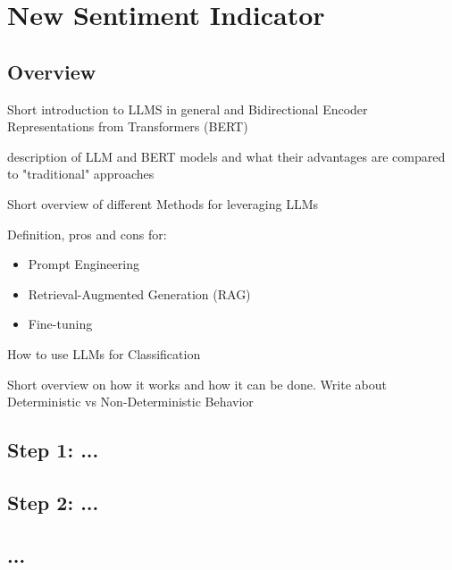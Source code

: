 \chapter{New Sentiment Indicator}\label{sec3}
\thispagestyle{empty}

\section{Overview}

Short introduction to LLMS in general and Bidirectional Encoder Representations from Transformers (BERT)

description of LLM and BERT models and what their advantages are compared to "traditional" approaches

Short overview of different Methods for leveraging LLMs

Definition, pros and cons for:

\begin{itemize}
	\item Prompt Engineering
	\item Retrieval-Augmented Generation (RAG)
	\item Fine-tuning
\end{itemize}

How to use LLMs for Classification

Short overview on how it works and how it can be done. Write about Deterministic vs Non-Deterministic Behavior


\section{Step 1: ...}

\section{Step 2: ...}

\section{...}

\cleardoublepage
